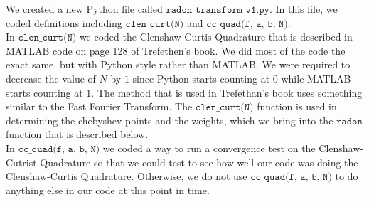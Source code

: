 
We created a new Python file called $\texttt{radon\_transform\_v1.py}$. In this file, we coded definitions including $\texttt{clen\_curt(N)}$ and $\texttt{cc\_quad(f, a, b, N)}$. \\

In $\texttt{clen\_curt(N)}$ we coded the Clenshaw-Curtis Quadrature that is described in MATLAB code on page 128 of Trefethen's book. We did most of the code the exact same, but with Python style rather than MATLAB. We were required to decrease the value of $N$ by $1$ since Python starts counting at $0$ while MATLAB starts counting at $1$. The method that is used in Trefethan's book uses something similar to the Fast Fourier Transform. The $\texttt{clen\_curt(N)}$ function is used in determining the chebyshev points and the weights, which we bring into the $\texttt{radon}$ function that is described below. \\

In $\texttt{cc\_quad(f, a, b, N)}$ we coded a way to run a convergence test on the Clenshaw-Cutrist Quadrature so that we could test to see how well our code was doing the Clenshaw-Curtis Quadrature. Otherwise, we do not use $\texttt{cc\_quad(f, a, b, N)}$ to do anything else in our code at this point in time. 